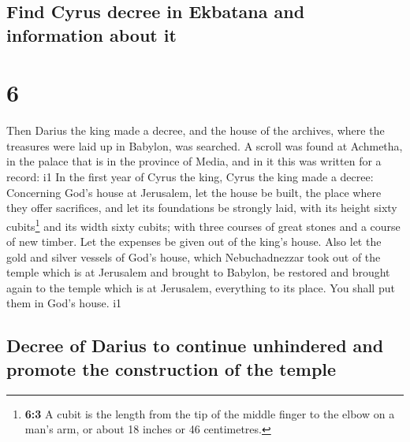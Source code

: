 \hypertarget{find-cyrus-decree-in-ekbatana-and-information-about-it}{%
\subsection{Find Cyrus decree in Ekbatana and information about
it}\label{find-cyrus-decree-in-ekbatana-and-information-about-it}}

\hypertarget{section-5}{%
\section{6}\label{section-5}}

 Then Darius the king made a decree, and the house of the
archives, where the treasures were laid up in Babylon, was searched.
 A scroll was found at Achmetha, in the palace that is in
the province of Media, and in it this was written for a record: i1
 In the first year of Cyrus the king, Cyrus the king made
a decree: Concerning God's house at Jerusalem, let the house be built,
the place where they offer sacrifices, and let its foundations be
strongly laid, with its height sixty cubits\footnote{\textbf{6:3} A
  cubit is the length from the tip of the middle finger to the elbow on
  a man's arm, or about 18 inches or 46 centimetres.} and its width
sixty cubits;  with three courses of great stones and a
course of new timber. Let the expenses be given out of the king's house.
 Also let the gold and silver vessels of God's house,
which Nebuchadnezzar took out of the temple which is at Jerusalem and
brought to Babylon, be restored and brought again to the temple which is
at Jerusalem, everything to its place. You shall put them in God's
house. i1

\hypertarget{decree-of-darius-to-continue-unhindered-and-promote-the-construction-of-the-temple}{%
\subsection{Decree of Darius to continue unhindered and promote the
construction of the
temple}\label{decree-of-darius-to-continue-unhindered-and-promote-the-construction-of-the-temple}}

